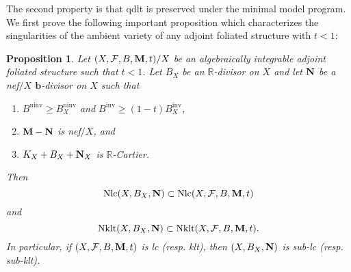 \documentclass[12pt]{amsart}
\numberwithin{equation}{section}
\newcommand{\bb}{\bm{b}}
\newcommand{\Mm}{{\bf{M}}}
\newcommand{\Nn}{{\bf{N}}}
\newcommand{\Rr}{\mathbb{R}}
\newcommand{\ninv}{\operatorname{ninv}}
\newcommand{\inv}{\operatorname{inv}}
\newcommand{\Nklt}{\operatorname{Nklt}}
\newcommand{\Nlc}{\operatorname{Nlc}}
\newcommand{\Ff}{\mathcal{F}}
\newtheorem{prop}[thm]{Proposition}
\theoremstyle{definition}
\theoremstyle{definition}
\theoremstyle{definition}
\begin{document}
The second property is that qdlt is preserved under the minimal model program. We first prove the following important proposition which characterizes the singularities of the ambient variety of any adjoint foliated structure with $t<1$:


\begin{prop}\label{prop: adjoint lc implies X lc}
     Let $(X,\Ff,B,\Mm,t)/X$ be an algebraically integrable adjoint foliated structure such that $t<1$. Let $B_X$ be an $\Rr$-divisor on $X$ and let $\Nn$ be a nef$/X$ $\bb$-divisor on $X$ such that
     \begin{enumerate}
     \item $B^{\ninv}\geq B_X^{\ninv}$ and $B^{\inv}\geq (1-t)B_X^{\inv}$,
     \item $\Mm-\Nn$ is nef$/X$, and
     \item $K_X+B_X+\Nn_X$ is $\Rr$-Cartier.
     \end{enumerate}
     Then
$$\Nlc(X,B_X,\Nn)\subset\Nlc(X,\Ff,B,\Mm,t)$$
and
$$\Nklt(X,B_X,\Nn)\subset\Nklt(X,\Ff,B,\Mm,t).$$
     In particular, if $(X,\Ff,B,\Mm,t)$ is lc (resp. klt), then $(X,B_X,\Nn)$ is sub-lc (resp. sub-klt).
\end{prop}
\end{document}
